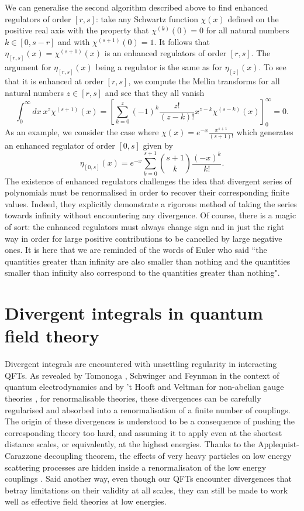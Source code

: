 \documentclass[11pt, letter]{article}
\def\be{\begin{equation}}
\def\ee{\end{equation}}
\begin{document}
We can generalise the second algorithm  described above to find enhanced regulators of order $[r, s]$: take any Schwartz function $\chi(x)$ defined on the positive real axis with the property that $\chi^{(k)}(0)=0$ for all natural numbers $k \in [0,s-r]$ and with $\chi^{(s+1)}(0)=1$. It follows that $\eta_{[r,s]}(x)=\chi^{(s+1)}(x)$ is an enhanced regulators of order $[r,s]$.  The argument for $\eta_{[r,s]}(x)$ being a regulator is the same as for $\eta_{[z]}(x)$. To see that it is enhanced at order $[r,s]$, we compute the Mellin transforms for all natural numbers $z\in [r, s]$ and see that they all vanish
\be
\int_0^\infty dx  \ x^z\chi^{(s+1)}(x)=\left[ \sum_{k=0}^{z} (-1)^k \frac{z!}{(z-k)!} x^{z-k} \chi^{(s-k)}(x)\right]^\infty_0=0.
\ee
As an example, we consider the case where $\chi(x)=e^{-x} \frac{x^{s+1}}{(s+1)!}$ which generates an enhanced regulator of order $[0,s]$ given by
\be
\eta_{[0, s]}(x)=e^{-x} \sum_{k=0}^{s+1} \binom{s+1}{k} \frac{(-x)^k}{k!}.
\ee
The existence of enhanced regulators challenges the idea that divergent series of polynomials must be renormalised in order to recover their corresponding finite values. Indeed, they  explicitly demonstrate  a rigorous method of taking the series towards infinity without encountering any divergence. Of course, there is a magic of sort: the enhanced regulators must always change sign and in just the right way in order for large positive contributions to be cancelled by large negative ones.  It is here that we are reminded of the words of Euler who said ``the quantities greater than infinity are also smaller than nothing and the quantities smaller than infinity also correspond to the quantities greater than nothing"\citep{Euler18DeSeriebusDivergentibus}.



\section{Divergent integrals in quantum field theory}\label{SecDivIntegrals}
Divergent integrals are encountered with unsettling regularity in interacting QFTs. As revealed by Tomonoga \cite{Tomonaga:1946zz}, Schwinger \cite{Schwinger:1948iu} and Feynman \cite{Feynman:1948fi} in the context of quantum electrodynamics and by 't Hooft and Veltman for non-abelian gauge theories \cite{tHooft:1972tcz},  for renormalisable theories, these divergences can be carefully regularised and absorbed into a renormalisation of a finite number of couplings.  The origin of these divergences is understood to be a consequence of pushing the corresponding theory too hard, and assuming it to apply even at the shortest distance scales, or equivalently, at the highest energies.  Thanks to the Applequist-Carazzone decoupling theorem, the effects of very heavy particles on low energy scattering processes are hidden inside a renormalisaton of the low energy couplings \cite{Appelquist:1974tg}.  Said another way, even though our QFTs encounter divergences that betray limitations on their validity at all scales, they can still be made to work well as effective field theories at low energies.
\end{document}
